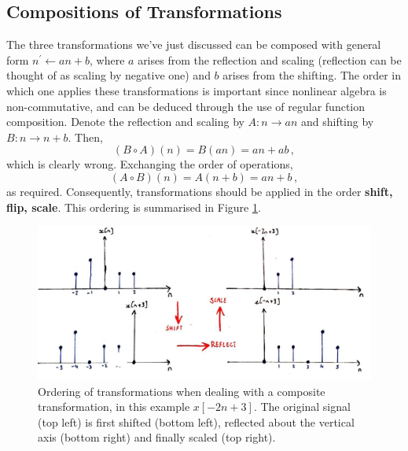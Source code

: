 \subsection{Compositions of Transformations}
%
The three transformations we've just discussed can be composed with general form
$n^\prime \leftarrow an + b$, where $a$ arises from the reflection and scaling (reflection
can be thought of as scaling by negative one) and $b$ arises from the shifting.
The order in which one applies these transformations is important since nonlinear algebra
is non-commutative, and can be deduced through the use of regular function composition.
Denote the reflection and scaling by $A: n\rightarrow an$ and shifting by
$B: n\rightarrow n+b$. Then,
%
\begin{displaymath}
  (B\circ A)(n) = B(an) = an + ab \,,
\end{displaymath}
%
which is clearly wrong. Exchanging the order of operations,
%
\begin{displaymath}
  (A\circ B)(n) = A(n + b) = an + b \,,
\end{displaymath}
%
as required. Consequently, transformations should be applied in the order
\textbf{shift, flip, scale}. This ordering is summarised in Figure
\ref{fig::lecture_1_transformation_order}.
%
\begin{figure}[!htb]
  \includegraphics[width=\textwidth]{images/lecture_1_transformation_order.JPG}
  \caption{
    Ordering of transformations when dealing with a composite transformation, in
    this example $x[-2n+3]$.
    The original signal (top left) is first shifted (bottom left), reflected
    about the vertical axis (bottom right) and finally scaled (top right).
  }
  \label{fig::lecture_1_transformation_order}
\end{figure}


